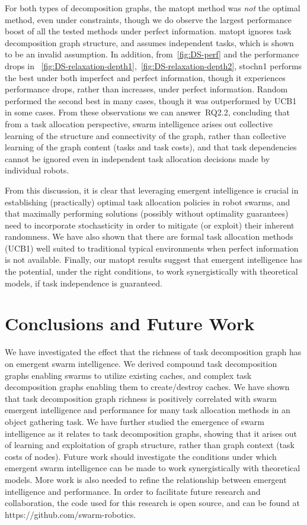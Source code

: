 {For both types of decomposition graphs, the \gls{matopt} method was \emph{not}
the optimal method, even under constraints, though we do observe the largest
performance boost of all the tested methods under perfect
information. \gls{matopt} ignores task decomposition graph structure, and
assumes independent tasks, which is shown to be an invalid assumption. In
addition, from~\cref{fig:DS-perf} and the performance drops in
~\cref{fig:DS-relaxation-depth1},~\cref{fig:DS-relaxation-depth2},
\gls{stochn1} performs the best under both imperfect and perfect information,
though it experiences performance drops, rather than increases, under perfect
information. Random performed the second best in many cases, though it was
outperformed by UCB1 in some cases. From these observations we can
answer~\gls{RQ2.2}, concluding that from a task allocation perspective, swarm
intelligence arises out collective learning of the structure and connectivity of
the graph, rather than collective learning of the graph content (tasks and task
costs), and that task dependencies cannot be ignored even in independent task
allocation decisions made by individual robots.

From this discussion, it is clear that leveraging emergent intelligence is crucial in
establishing (practically) optimal task allocation policies in robot swarms, and that
maximally performing solutions (possibly without optimality guarantees) need to
incorporate stochasticity in order to mitigate (or exploit) their inherent
randomness. We have also shown that there are formal task allocation methods (UCB1)
well suited to traditional typical environments when perfect information is not
available. Finally, our \gls{matopt} results suggest that emergent intelligence has the
potential, under the right conditions, to work synergistically with theoretical
models, if task independence is guaranteed.
%
\section{Conclusions and Future Work}\label{sec:conclusions}
%
We have investigated the effect that the richness of task decomposition graph has on
emergent swarm intelligence. We derived compound task decomposition graphs enabling
swarms to utilize existing caches, and complex task decomposition graphs enabling
them to create/destroy caches. We have shown that task decomposition graph richness
is positively correlated with swarm emergent intelligence and performance for many
task allocation methods in an object gathering task. We have further studied the
emergence of swarm intelligence as it relates to task decomposition graphs, showing
that it arises out of learning and exploitation of graph structure, rather than graph
context (task costs of nodes). Future work should investigate the conditions under
which emergent swarm intelligence can be made to work synergistically with
theoretical models. More work is also needed to refine the relationship between
emergent intelligence and performance. In order to facilitate future research and
collaboration, the code used for this research is open source, and can be found at
https://github.com/swarm-robotics.
}
